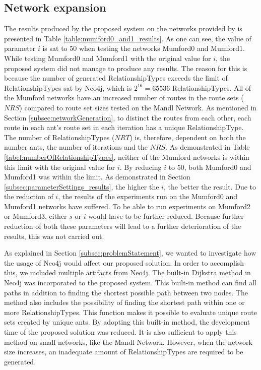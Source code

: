 \subsection{Network expansion}
\label{subsec:networkExpansion}

The results produced by the proposed system on the networks provided by \citet{mumford13} is presented in  Table \vref{table:mumford0_and1_results}. As one can see, the value of parameter $i$ is sat to 50 when testing the networks Mumford0 and Mumford1. While testing Mumford0 and Mumford1 with the original value for $i$, the proposed system did not manage to produce any results. The reason for this is because the number of generated RelationshipTypes exceeds the limit of RelationshipTypes sat by Neo4j, which is $2^{16} = 65 536$ RelationshipTypes. All of the Mumford networks have an increased number of routes in the route sets ($NRS$) compared to route set sizes tested on the Mandl Network. As mentioned in Section \vref{subsec:networkGeneration}, to distinct the routes from each other, each route in each ant's route set in each iteration has a unique RelationshipType. The number of RelationshipTypes ($NRT$) is, therefore, dependent on both the number ants, the number of iterations and the $NRS$. As demonstrated in Table \vref{tabel:numberOfRelationshipTypes}, neither of the Mumford-networks is within this limit with the original value for $i$. By reducing $i$ to 50, both Mumford0 and Mumford1 was within the limit. As demonstrated in Section \vref{subsec:parameterSettings_results}, the higher the $i$, the better the result. Due to the reduction of $i$, the results of the experiments run on the Mumford0 and Mumford1 networks have suffered. To be able to run experiments on Mumford2 or Mumford3, either $s$ or $i$ would have to be further reduced. Because further reduction of both these parameters will lead to a further deterioration of the results, this was not carried out.

As explained in Section \vref{subsec:problemStatement}, we wanted to investigate how the usage of Neo4j would affect our proposed solution. In order to accomplish this, we included multiple artifacts from Neo4j.  The built-in Dijkstra method in Neo4j was incorporated to the proposed system. This built-in method can find all paths in addition to finding the shortest possible path between two nodes. The method also includes the possibility of finding the shortest path within one or more RelationshipTypes. This function makes it possible to evaluate unique route sets created by unique ants. By adopting this built-in method, the development time of the proposed solution was reduced. It is also sufficient to apply this method on small networks, like the Mandl Network. However, when the network size increases, an inadequate amount of RelationshipTypes are required to be generated.
\newline

